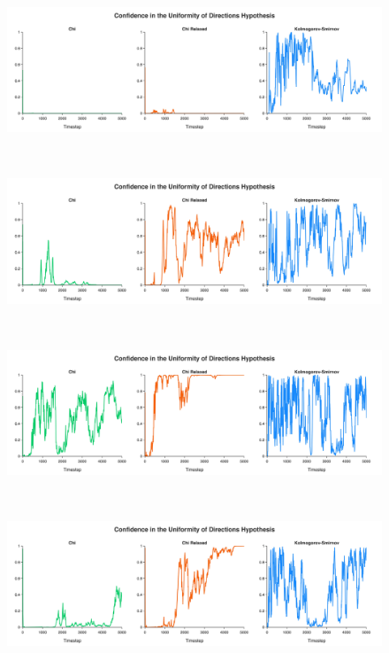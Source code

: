 \documentclass[10pt]{article}
\begin{document}
\begin{figure}[H]
    \centering
    \begin{minipage}{0.9\linewidth}
        \includegraphics[width=\linewidth]{../figures/jpg/uniformity/atoms_1000_temp_300_uniformity_confidence.jpg}
    \end{minipage} \\
    \begin{minipage}{0.9\linewidth}
        \includegraphics[width=\linewidth]{../figures/jpg/uniformity/atoms_1000_temp_1000_uniformity_confidence.jpg}
    \end{minipage} \\
    \begin{minipage}{0.9\linewidth}
        \includegraphics[width=\linewidth]{../figures/jpg/uniformity/atoms_1000_temp_5000_uniformity_confidence.jpg}
    \end{minipage} \\
    \begin{minipage}{0.9\linewidth}
        \includegraphics[width=\linewidth]{../figures/jpg/uniformity/atoms_1000_temp_10000_uniformity_confidence.jpg}

\end{minipage}
\end{figure}
\end{document}
